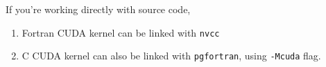 If you're working directly with source code, 
\begin{enumerate}
 \item Fortran CUDA kernel can be linked with \verb!nvcc!
\item C CUDA kernel can also be linked with \verb!pgfortran!, using
  \verb!-Mcuda! flag. 
\end{enumerate}




